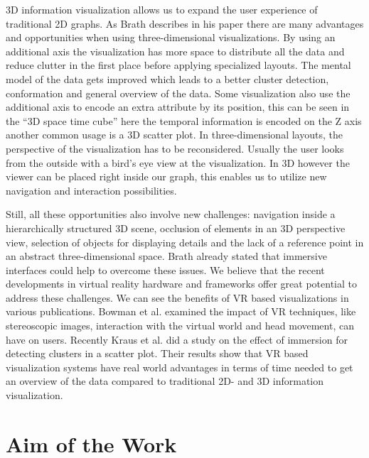 3D information visualization allows us to expand the user experience of traditional 2D graphs. As Brath describes in his paper \cite{brath_3d_2014} there are many advantages and opportunities when using three-dimensional visualizations.
By using an additional axis the visualization has more space to distribute all the data and reduce clutter in the first place before applying specialized layouts. The mental model of the data gets improved which leads to a better cluster detection, conformation and general overview of the data. 
Some visualization also use the additional axis to encode an extra attribute by its position, this can be seen in the “3D space time cube” \cite{brath_3d_2014} here the temporal information is encoded on the Z axis another common usage is a 3D scatter plot.
In three-dimensional layouts, the perspective of the visualization has to be reconsidered. Usually the user looks from the outside with a bird's eye view at the visualization. In 3D however the viewer can be placed right inside our graph, this enables us to utilize new navigation and interaction possibilities.

Still, all these opportunities also involve new challenges: navigation inside a hierarchically structured 3D scene, occlusion of elements in an 3D perspective view, selection of objects for displaying details and the lack of a reference point in an abstract three-dimensional space. Brath \cite{brath_3d_2014} already stated that immersive interfaces could help to overcome these issues.\label{chap:advantages_VR}
We believe that the recent developments in virtual reality hardware and frameworks offer great potential to address these challenges. 
We can see the benefits of VR based visualizations in various publications. Bowman et al. \cite{bowman_virtual_2007} examined the impact of VR techniques, like stereoscopic images, interaction with the virtual world and head movement, can have on users. 
Recently Kraus et al. \cite{kraus_impact_2020} did a study on the effect of immersion for detecting clusters in a scatter plot. Their results show that VR based visualization systems have real world advantages in terms of time needed to get an overview of the data compared to traditional 2D- and 3D information visualization. 
 
\section{Aim of the Work}

